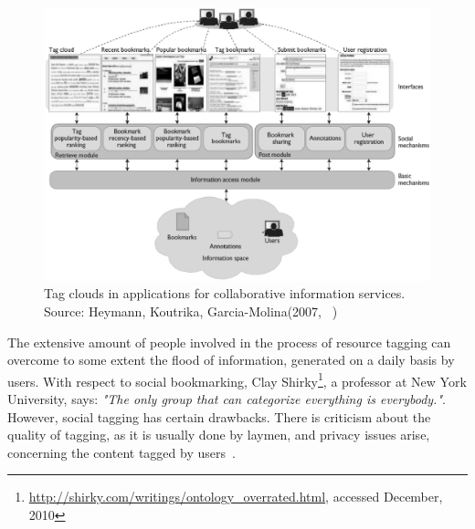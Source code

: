 \begin{figure}
	\centering
	\includegraphics[scale=0.6]{img/collaborativeTagging} 
	\caption[Tag clouds in collaborative information services]
           {Tag clouds in applications for collaborative information services. Source: Heymann, Koutrika, Garcia-Molina(2007, ~\cite{tagcloud_spam2007})}
\label{collaborativeTagging}
\end{figure}

The extensive amount of people involved in the process of resource tagging can overcome to some extent the flood of information, generated on a daily basis by users. With respect to social bookmarking, Clay Shirky\footnote{\url{http://shirky.com/writings/ontology_overrated.html}, accessed December, 2010}, a professor at New York University, says: \textit{"The only group that can categorize everything is everybody."}. However, social tagging has certain drawbacks. There is criticism about the quality of tagging, as it is usually done by laymen, and privacy issues arise, concerning the content tagged by users~\cite{folksonomiesWeb2.0_2009}. \\


